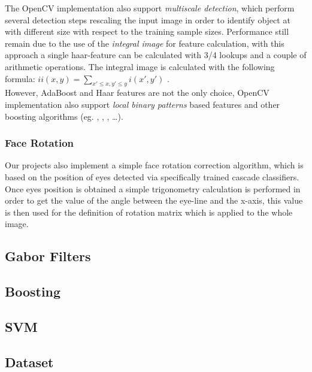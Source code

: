 The OpenCV implementation also support \emph{multiscale detection}, which perform several detection steps rescaling the input image in order to identify object at with different size with respect to the training sample sizes. Performance still remain due to the use of the \emph{integral image} for feature calculation, with this approach a single haar-feature can be calculated with 3/4 lookups and a couple of arithmetic operations. The integral image is calculated with the following formula: $ ii(x,y) = \sum_{x' \leq x, y' \leq y}{ i(x',y') } $ .\\

However, AdaBoost and Haar features are not the only choice, OpenCV implementation also support \emph{local binary patterns} based features and other boosting algorithms (eg. , , , \ldots).


\subsubsection*{Face Rotation}

Our projects also implement a simple face rotation correction algorithm, which is based on the position of eyes detected via specifically trained cascade classifiers. Once eyes position is obtained a simple trigonometry calculation is performed in order to get the value of the angle between the eye-line and the x-axis, this value is then used for the definition of rotation matrix which is applied to the whole image.

\subsection{Gabor Filters}


\subsection{Boosting}
\label{appr:boosting}

\subsection{SVM}


\subsection{Dataset}


